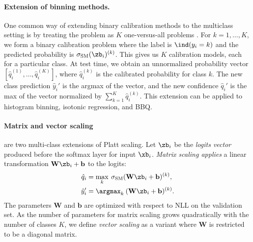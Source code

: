 
\newcommand{\bb}{\mathbf{b}}
\newcommand{\Wb}{\mathbf{W}}


\paragraph{Extension of binning methods.} One common way of extending binary calibration methods to the multiclass setting is by treating the problem as $K$ one-versus-all problems \cite{zadrozny2002transforming}.
For $k = 1,\ldots,K$, we form a binary calibration problem where the label is $\ind(y_i = k)$ and the predicted probability is $\sigma_\text{SM}(\zb_i)^{(k)}$. This gives us $K$ calibration models, each for a particular class. At test time, we obtain an unnormalized probability vector $[ \hat q_i^{(1)}, \ldots, \hat q_i^{(K)} ]$, where $\hat q_i^{(k)}$ is the calibrated probability for class $k$. The new class prediction $\hat y_i'$ is the argmax of the vector, and the new confidence $\hat q_i'$ is the max of the vector normalized by $\sum_{k=1}^K \hat q_i^{(k)}$. This extension can be applied to histogram binning, isotonic regression, and BBQ.

\paragraph{Matrix and vector scaling} are two multi-class extensions of Platt scaling. Let $\zb_i$ be the \emph{logits vector} produced before the softmax layer for input $\xb_i$. \emph{Matrix scaling applies} a linear transformation $\Wb \zb_i + \bb$ to the logits:
\begin{equation}
\label{scaling}
\begin{aligned}
\hat q_i  &= \max_k \: \sigma_\text{SM} ( \Wb \zb_i + \bb)^{(k)}, \\
\hat y_i' &= \argmax_k \: (\Wb \zb_i + \bb)^{(k)}.
\end{aligned}
\end{equation}
The parameters $\Wb$ and $\bb$ are optimized with respect to NLL on the validation set. As the number of parameters for matrix scaling grows quadratically with the number of classes $K$, we define \emph{vector scaling} as a variant where $\Wb$ is restricted to be a diagonal matrix.

